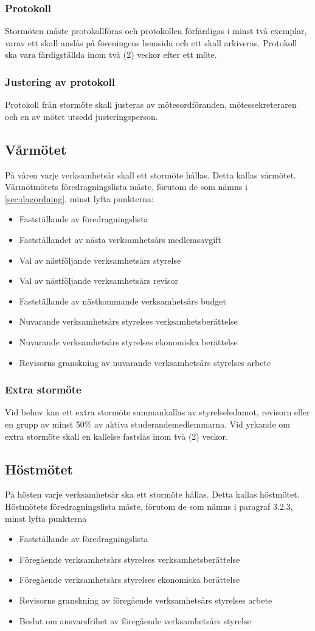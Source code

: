 \documentclass[11pt,a4paper]{article}
\begin{document}
\subsubsection{Protokoll}
Stormöten måste protokollföras och protokollen förfärdigas i minst två exemplar, varav ett skall anslås på föreningens hemsida och ett skall arkiveras. Protokoll ska vara färdigställda inom två (2) veckor efter ett möte.
\subsubsection{Justering av protokoll}
Protokoll från stormöte skall justeras av mötesordföranden, mötessekreteraren och en av mötet utsedd justeringsperson.
\subsection{Vårmötet}
På våren varje verksamhetsår skall ett stormöte hållas. Detta kallas vårmötet. Vårmötmötets föredragningslista måste, förutom de som nämns i \ref{sec:dagordning}, minst lyfta punkterna:
\begin{itemize}
    \item Fastställande av föredragningslista
	\item Fastställandet av nästa verksamhetsårs medlemsavgift
	\item Val av nästföljande verksamhetsårs styrelse
	\item Val av nästföljande verksamhetsårs revisor
	\item Fastställande av nästkommande verksamhetsårs budget
	\item Nuvarande verksamhetsårs styrelses verksamhetsberättelse
	\item Nuvarande verksamhetsårs styrelses ekonomiska berättelse
	\item Revisorns granskning av nuvarande verksamhetsårs styrelses arbete
\end{itemize}
\subsubsection{Extra stormöte}
Vid behov kan ett extra stormöte sammankallas av styrelseledamot, revisorn eller en grupp av minst 50\% av aktiva studerandemedlemmarna. Vid yrkande om extra stormöte skall en kallelse fastslås inom två (2) veckor.
\subsection{Höstmötet}
På hösten varje verksamhetsår ska ett stormöte hållas. Detta kallas höstmötet. Höstmötets föredragningslista måste, förutom de som nämns i paragraf 3.2.3, minst lyfta punkterna
\begin{itemize}
    \item Fastställande av föredragningslista
	\item Föregående verksamhetsårs styrelses verksamhetsberättelse
	\item Föregående verksamhetsårs styrelses ekonomiska berättelse
	\item Revisorns granskning av föregående verksamhetsårs styrelses arbete
	\item Beslut om ansvarsfrihet av föregående verksamhetsårs styrelse
\end{itemize}
\end{document}
